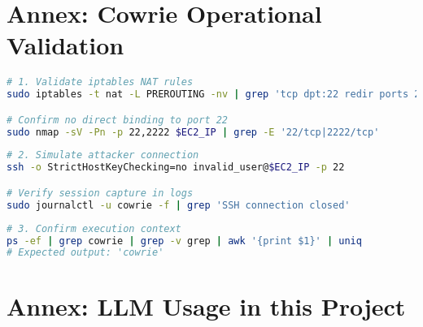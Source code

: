 




\newpage

\section{Annex: Cowrie Operational Validation}  
\label{annex:cowrie-validation}  

\begin{lstlisting}[language=bash,label={lst:cowrie-redirect},caption={Traffic Redirection Verification}]  
# 1. Validate iptables NAT rules  
sudo iptables -t nat -L PREROUTING -nv | grep 'tcp dpt:22 redir ports 2222'  

# Confirm no direct binding to port 22  
sudo nmap -sV -Pn -p 22,2222 $EC2_IP | grep -E '22/tcp|2222/tcp'  
\end{lstlisting}  

\begin{lstlisting}[language=bash,label={lst:cowrie-access},caption={Honeypot Engagement Testing}]  
# 2. Simulate attacker connection  
ssh -o StrictHostKeyChecking=no invalid_user@$EC2_IP -p 22  

# Verify session capture in logs  
sudo journalctl -u cowrie -f | grep 'SSH connection closed'  
\end{lstlisting}  

\begin{lstlisting}[language=bash,label={lst:cowrie-context},caption={Process Isolation Validation}]  
# 3. Confirm execution context  
ps -ef | grep cowrie | grep -v grep | awk '{print $1}' | uniq  
# Expected output: 'cowrie'  
\end{lstlisting}  




\newpage


\newpage 


\section{Annex: LLM Usage in this Project}  
\label{annex:llm}  

